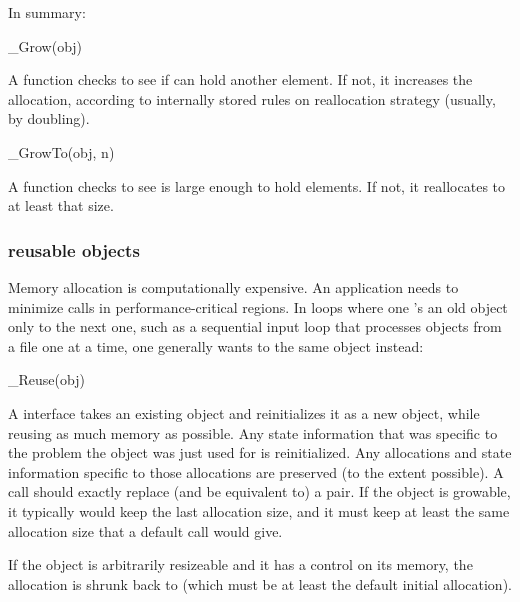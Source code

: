 In summary: 

\begin{sreapi}
\hypertarget{ifc:Grow}
{\item[\_Grow(obj)]}

A  function checks to see if  can hold
another element. If not, it increases the allocation, according to
internally stored rules on reallocation strategy (usually, by
doubling). 
\end{sreapi}

\begin{sreapi}
\hypertarget{ifc:GrowTo}
{\item[\_GrowTo(obj, n)]}

A  function checks to see  is large
enough to hold  elements. If not, it reallocates to at least
that size.
\end{sreapi}

  \subsubsection{reusable objects}

Memory allocation is computationally expensive. An application needs
to minimize  calls in performance-critical
regions. In loops where one 's an old object only
to  the next one, such as a sequential input loop
that processes objects from a file one at a time, one generally wants
to  the same object instead:

\begin{sreapi}
\hypertarget{ifc:Reuse}
{\item[\_Reuse(obj)]}

A  interface takes an existing object and
reinitializes it as a new object, while reusing as much memory as
possible. Any state information that was specific to the problem the
object was just used for is reinitialized. Any allocations and state
information specific to those allocations are preserved (to the extent
possible).  A  call should exactly replace (and be
equivalent to) a  pair. If the object is
growable, it typically would keep the last allocation size, and it
must keep at least the same allocation size that a default
 call would give.

If the object is arbitrarily resizeable and it has a 
control on its memory, the allocation is shrunk back to
 (which must be at least the default initial
allocation).

\end{sreapi}

